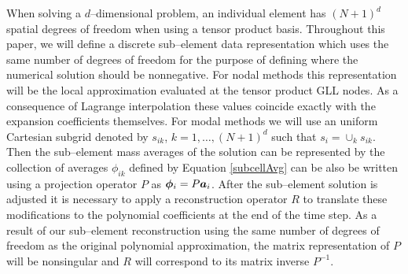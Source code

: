 \documentclass{ametsoc}
\begin{document}
When solving a $d$--dimensional problem, an individual element has $(N+1)^d$ spatial degrees of freedom when using a tensor product basis. Throughout this paper, we will define a discrete sub--element data representation which uses the same number of degrees of freedom for the purpose of defining where the numerical solution should be nonnegative. For nodal methods this representation will be the local approximation evaluated at the tensor product GLL nodes. As a consequence of Lagrange interpolation these values coincide exactly with the expansion coefficients themselves. For modal methods we will use an uniform Cartesian subgrid denoted by $s_{ik}$, $k=1,\dots,(N+1)^d$ such that $s_i = \cup_{k} s_{ik}$. Then the sub--element mass averages of the solution can be represented by the collection of averages $\phi_{ik}$ defined by
Equation \eqref{subcellAvg} can be also be written using a projection operator $P$ as $\boldsymbol{\phi}_i = P \boldsymbol{a}_i$. After the sub--element solution is adjusted it is necessary to apply a reconstruction operator $R$ to translate these modifications to the polynomial coefficients at the end of the time step. As a result of our sub--element reconstruction using the same number of degrees of freedom as the original polynomial approximation, the matrix representation of $P$ will be nonsingular and $R$ will correspond to its matrix inverse $P^{-1}$. 
\end{document}
